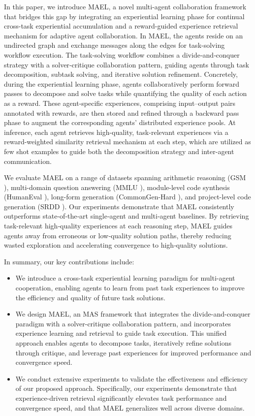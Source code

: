 \documentclass[preprint]{article}
\begin{document}
In this paper, we introduce MAEL, a novel multi-agent collaboration framework that bridges this gap by integrating an experiential learning phase for continual cross-task experiential accumulation and a reward-guided experience retrieval mechanism for adaptive agent collaboration.
In MAEL, the agents reside on an undirected graph and exchange messages along the edges for task-solving workflow execution. The task-solving workflow combines a divide‑and‑conquer strategy with a solver‑critique collaboration pattern, guiding agents through task decomposition, subtask solving, and iterative solution refinement.
Concretely, during the experiential learning phase, agents collaboratively perform forward passes to decompose and solve tasks while quantifying the quality of each action as a reward. These agent-specific experiences, comprising input–output pairs annotated with rewards, are then stored and refined through a backward pass phase to augment the corresponding agents' distributed experience pools. At inference, each agent retrieves high-quality, task-relevant experiences via a reward-weighted similarity retrieval mechanism at each step, which are utilized as few shot examples to guide both the decomposition strategy and inter-agent communication.


We evaluate MAEL on a range of datasets spanning arithmetic reasoning (GSM \citet{Cobbe2021Training}), multi-domain question answering (MMLU \citet{Hendrycks2020MeasuringMM}), module-level code synthesis (HumanEval \citet{chen2021evaluating}), long-form generation (CommonGen-Hard \citet{Madaan2023Self}), and project-level code generation (SRDD \citet{qian2023communicative}).  
Our experiments demonstrate that MAEL consistently outperforms state‑of‑the‑art single‑agent and multi‑agent baselines.
By retrieving task-relevant high‑quality experiences at each reasoning step, MAEL guides agents away from erroneous or low‑quality solution paths, thereby reducing wasted exploration and accelerating convergence to high‑quality solutions.

In summary, our key contributions include:
\begin{itemize}[left=0pt, noitemsep]
\item We introduce a cross-task experiential learning paradigm for multi-agent cooperation, enabling agents to learn from past task experiences to improve the efficiency and quality of future task solutions.
\item We design MAEL, an MAS framework that integrates the divide-and-conquer paradigm with a solver-critique collaboration pattern, and incorporates experience learning and retrieval to guide task execution. This unified approach enables agents to decompose tasks, iteratively refine solutions through critique, and leverage past experiences for improved performance and convergence speed. 
\item We conduct extensive experiments to validate the effectiveness and efficiency of our proposed approach. Specifically, our experiments demonstrate that experience-driven retrieval significantly elevates task performance and convergence speed, and that MAEL generalizes well across diverse domains.
\end{itemize}
\end{document}
